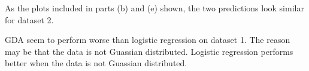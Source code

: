 \begin{answer}
    As the plots included in parts (b) and (e) shown, the two predictions
    look similar for dataset 2. 

    GDA seem to perform worse than logistic regression on dataset 1. The reason
    may be that the data is not Guassian distributed. Logistic regression performs
    better when the data is not Guassian distributed.
\end{answer}
